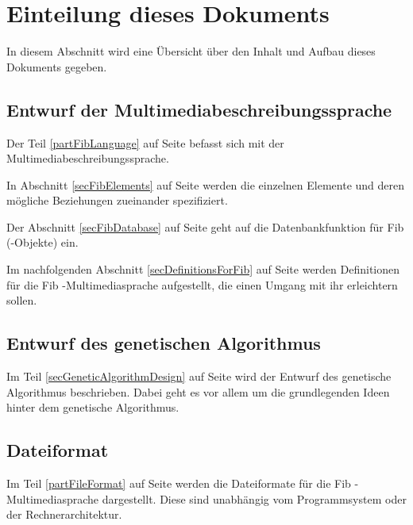 \documentclass[11pt,a4paper]{article}
\begin{document}
\section{Einteilung dieses Dokuments}

In diesem Abschnitt wird eine Übersicht über den Inhalt und Aufbau dieses Dokuments gegeben.




\subsection{Entwurf der Multimediabeschreibungssprache}

Der Teil \ref{partFibLanguage} auf Seite \pageref{partFibLanguage} befasst sich mit der Multimediabeschreibungssprache.

In Abschnitt \ref{secFibElements} auf Seite \pageref{secFibElements} werden die einzelnen Elemente und deren mögliche Beziehungen zueinander spezifiziert.

Der Abschnitt \ref{secFibDatabase} auf Seite \pageref{secFibDatabase} geht auf die Datenbankfunktion für Fib (-Objekte) ein.

Im nachfolgenden Abschnitt \ref{secDefinitionsForFib} auf Seite \pageref{secDefinitionsForFib} werden Definitionen für die Fib -Multimediasprache aufgestellt, die einen Umgang mit ihr erleichtern sollen.



\subsection{Entwurf des genetischen Algorithmus}

Im Teil \ref{secGeneticAlgorithmDesign} auf Seite \pageref{secGeneticAlgorithmDesign} wird der Entwurf des genetische Algorithmus beschrieben. Dabei geht es vor allem um die grundlegenden Ideen hinter dem genetische Algorithmus.


\subsection{Dateiformat}

Im Teil \ref{partFileFormat} auf Seite \pageref{partFileFormat} werden die Dateiformate für die Fib -Multimediasprache dargestellt. Diese sind unabhängig vom Programmsystem oder der Rechnerarchitektur.



\end{document}
